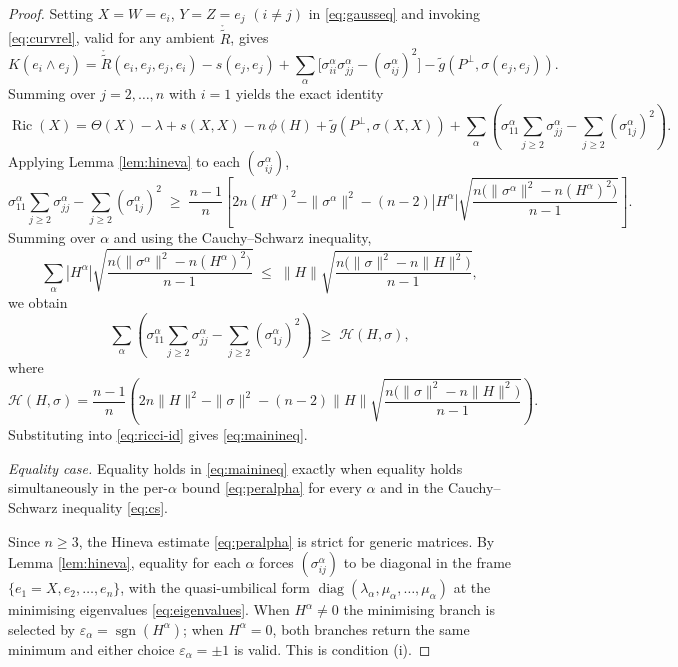 \documentclass[11pt]{article}
\theoremstyle{definition}
\newcommand{\tg}{\widetilde{g}}
\newcommand{\ctR}{\mathring{\widetilde{R}}}
\newcommand{\Ric}{\operatorname{Ric}}
\newcommand{\sgn}{\operatorname{sgn}}
\newcommand{\HH}{\mathcal{H}}
\begin{document}
\begin{proof}
Setting $X=W=e_i$, $Y=Z=e_j$ $(i\neq j)$ in \eqref{eq:gausseq} and invoking \eqref{eq:curvrel}, valid for any ambient $\ctR$, gives
\begin{equation}\label{eq:sect-id}
K(e_i\wedge e_j)=\ctR(e_i,e_j,e_j,e_i)-s(e_j,e_j)+\sum_\alpha\bigl[\sigma^\alpha_{ii}\sigma^\alpha_{jj}-(\sigma^\alpha_{ij})^2\bigr]-\tg(P^\perp,\sigma(e_j,e_j)).
\end{equation}
 Summing over $j=2,\dots,n$ with $i=1$ yields the exact identity
\begin{equation}\label{eq:ricci-id}
\Ric(X)=\Theta(X)-\lambda+s(X,X)-n\,\phi(H)+\tg(P^\perp,\sigma(X,X))+\sum_\alpha\left(\sigma^\alpha_{11}\sum_{j\ge2}\sigma^\alpha_{jj}-\sum_{j\ge2}(\sigma^\alpha_{1j})^2\right).
\end{equation}
Applying Lemma \ref{lem:hineva} to each $(\sigma^\alpha_{ij})$,
\begin{equation}\label{eq:peralpha}
\sigma^\alpha_{11}\sum_{j\ge2}\sigma^\alpha_{jj}-\sum_{j\ge2}(\sigma^\alpha_{1j})^2\;\ge\;\frac{n-1}{n}\left[2n(H^\alpha)^2-\|\sigma^\alpha\|^2-(n-2)|H^\alpha|\sqrt{\frac{n\bigl(\|\sigma^\alpha\|^2-n(H^\alpha)^2\bigr)}{n-1}}\right].
\end{equation}
Summing over $\alpha$ and using the Cauchy--Schwarz inequality,
\begin{equation}\label{eq:cs}
\sum_\alpha|H^\alpha|\sqrt{\frac{n\bigl(\|\sigma^\alpha\|^2-n(H^\alpha)^2\bigr)}{n-1}}\;\le\;\|H\|\sqrt{\frac{n\bigl(\|\sigma\|^2-n\|H\|^2\bigr)}{n-1}},
\end{equation}
we obtain
\[
\sum_\alpha\left(\sigma^\alpha_{11}\sum_{j\ge2}\sigma^\alpha_{jj}-\sum_{j\ge2}(\sigma^\alpha_{1j})^2\right)\;\ge\;\HH(H,\sigma),
\]
where
\begin{equation}\label{eq:Hcal}
\HH(H,\sigma)=\frac{n-1}{n}\left(2n\|H\|^2-\|\sigma\|^2-(n-2)\|H\|\sqrt{\frac{n\bigl(\|\sigma\|^2-n\|H\|^2\bigr)}{n-1}}\right).
\end{equation}
Substituting into \eqref{eq:ricci-id} gives \eqref{eq:mainineq}.

\emph{Equality case.} Equality holds in \eqref{eq:mainineq} exactly when equality holds simultaneously in the per-$\alpha$ bound \eqref{eq:peralpha} for every $\alpha$ and in the Cauchy--Schwarz inequality \eqref{eq:cs}.

Since $n\ge3$, the Hineva estimate \eqref{eq:peralpha} is strict for generic matrices. By Lemma \ref{lem:hineva}, equality for each $\alpha$ forces $(\sigma^\alpha_{ij})$ to be diagonal in the frame $\{e_1=X,e_2,\dots,e_n\}$, with the quasi-umbilical form $\operatorname{diag}(\lambda_\alpha,\mu_\alpha,\dots,\mu_\alpha)$ at the minimising eigenvalues \eqref{eq:eigenvalues}. When $H^\alpha\neq0$ the minimising branch is selected by $\varepsilon_\alpha=\sgn(H^\alpha)$; when $H^\alpha=0$, both branches return the same minimum and either choice $\varepsilon_\alpha=\pm1$ is valid. This is condition (i).


\end{proof}
\end{document}
